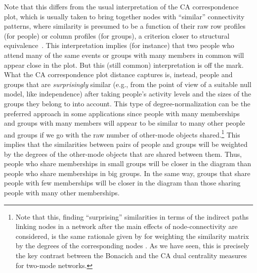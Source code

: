 \documentclass[a4paper,fleqn]{cas-sc}
\begin{document}
Note that this differs from the usual interpretation of the CA correspondence plot, which is usually taken to bring together nodes with ``similar'' connectivity patterns, where similarity is presumed to be a function of their raw row profiles (for people) or column profiles (for groups), a criterion closer to structural equivalence~\citep{ragozini2014correspondence}. This interpretation implies (for instance) that two people who attend many of the same events or groups with many members in common will appear close in the plot. But this (still common) interpretation is off the mark. What the CA correspondence plot distance captures is, instead, people and groups that are \textit{surprisingly} similar (e.g., from the point of view of a suitable null model, like independence) after taking people's activity levels and the sizes of the groups they belong to into account. This type of degree-normalization can be the preferred approach in some applications since people with many memberships and groups with many members will appear to be similar to many other people and groups if we go with the raw number of other-mode objects shared.\footnote{Note that this, finding ``surprising'' similarities in terms of the indirect paths linking nodes in a network after the main effects of node-connectivity are considered, is the same rationale given by \cite{leicht2006vertex} for weighting the \citet{katz1953new} similarity matrix by the degrees of the corresponding nodes \citep[see][68, eqs. 2.13 and 2.14]{fouss2016algorithms}. As we have seen, this is precisely the key contrast between the Bonacich and the CA dual centrality measures for two-mode networks.} This implies that the similarities between pairs of people and groups will be weighted by the degrees of the other-mode objects that are shared between them. Thus, people who share memberships in small groups will be closer in the diagram than people who share memberships in big groups. In the same way, groups that share people with few memberships will be closer in the diagram than those sharing people with many other memberships. 
\end{document}
